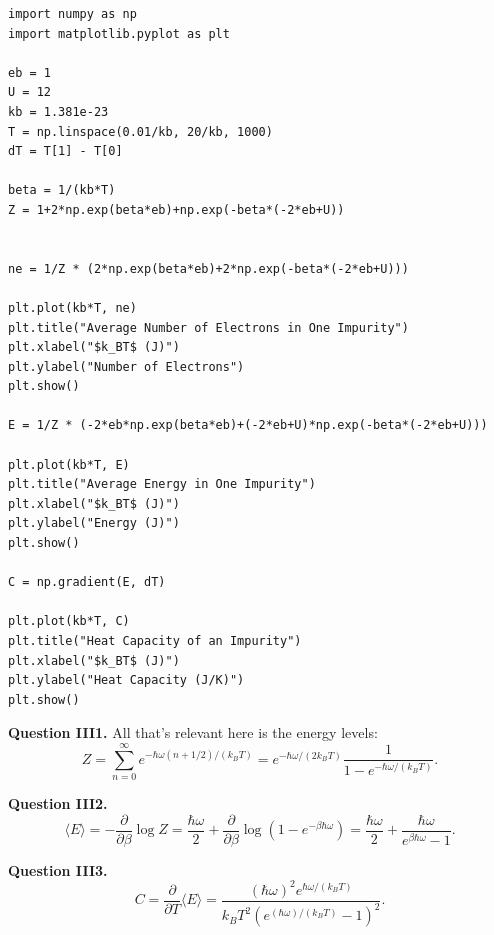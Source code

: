 \documentclass[letterpaper, reqno,11pt]{article}
\begin{document}
\begin{lstlisting}
import numpy as np
import matplotlib.pyplot as plt

eb = 1
U = 12
kb = 1.381e-23
T = np.linspace(0.01/kb, 20/kb, 1000)
dT = T[1] - T[0]

beta = 1/(kb*T)
Z = 1+2*np.exp(beta*eb)+np.exp(-beta*(-2*eb+U))


ne = 1/Z * (2*np.exp(beta*eb)+2*np.exp(-beta*(-2*eb+U)))

plt.plot(kb*T, ne)
plt.title("Average Number of Electrons in One Impurity")
plt.xlabel("$k_BT$ (J)")
plt.ylabel("Number of Electrons")
plt.show()

E = 1/Z * (-2*eb*np.exp(beta*eb)+(-2*eb+U)*np.exp(-beta*(-2*eb+U)))

plt.plot(kb*T, E)
plt.title("Average Energy in One Impurity")
plt.xlabel("$k_BT$ (J)")
plt.ylabel("Energy (J)")
plt.show()

C = np.gradient(E, dT)

plt.plot(kb*T, C)
plt.title("Heat Capacity of an Impurity")
plt.xlabel("$k_BT$ (J)")
plt.ylabel("Heat Capacity (J/K)")
plt.show()
\end{lstlisting}

{\medskip\noindent\bf Question III1.} All that's relevant here is the energy levels:
\[
Z = \sum_{n=0}^{\infty}e^{-\hbar\omega(n+1 /2)/(k_BT)}=e^{-\hbar\omega/(2k_BT)} \frac{1}{1-e^{-\hbar\omega /(k_BT)}}
.\]

{\medskip\noindent\bf Question III2.}
\[
\langle E \rangle = -\frac{\partial}{\partial \beta}\log Z=\frac{\hbar\omega}{2}+\frac{\partial}{\partial \beta}\log\left( 1-e^{-\beta\hbar\omega}\right)=\frac{\hbar\omega}{2}+ \frac{\hbar\omega}{e^{\beta\hbar\omega}-1}
.\]

{\medskip\noindent\bf Question III3.} 
\[
C=\frac{\partial}{\partial T}\langle E \rangle = \frac{(\hbar\omega)^2e^{\hbar\omega/(k_BT)}}{k_BT^2\left( e^{(\hbar\omega)/(k_BT)}-1 \right) ^2}
.\]
\end{document}
